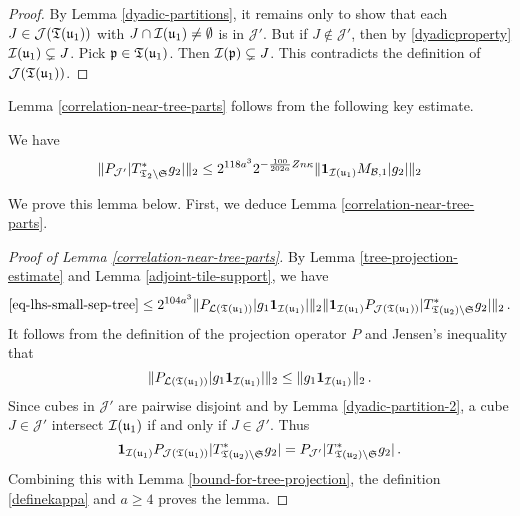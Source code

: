 {    \begin{proof}
        By Lemma \ref{dyadic-partitions}, it remains only to show that each $J \in \mathcal{J}({\mathfrak T}({\mathfrak u}_1))$ with $J \cap {\mathcal{I}}({\mathfrak u}_1) \ne \emptyset$ is in $\mathcal{J}'$. But if $J \notin \mathcal{J}'$, then by \eqref{dyadicproperty} ${\mathcal{I}}({\mathfrak u}_1) \subsetneq J$. Pick ${\mathfrak p} \in {\mathfrak T}({\mathfrak u}_1)$.  Then ${\mathcal{I}}({\mathfrak p}) \subsetneq J$. This contradicts the definition of $\mathcal{J}({\mathfrak T}({\mathfrak u}_1))$.
    \end{proof}

    Lemma \ref{correlation-near-tree-parts} follows from the following key estimate.

    \begin{lemma}
        \label{bound-for-tree-projection}
        We have
        $$
            \|P_{\mathcal{J}'}|T_{\mathfrak{T}_2 \setminus \mathfrak{S}}^* g_2|\|_2
            \le 2^{118a^3} 2^{-\frac{100}{202a}Zn\kappa} \|\mathbf{1}_{{\mathcal{I}}({\mathfrak u}_1)} M_{\mathcal{B},1} |g_2|\|_2
        $$
    \end{lemma}

    We prove this lemma below. First, we deduce Lemma \ref{correlation-near-tree-parts}.

    \begin{proof}[Proof of Lemma \ref{correlation-near-tree-parts}]
        By Lemma \ref{tree-projection-estimate} and Lemma \ref{adjoint-tile-support}, we have
        \begin{align*}
            \eqref{eq-lhs-small-sep-tree} \le 2^{104a^3} \|P_{\mathcal{L}({\mathfrak T}({\mathfrak u}_1))} |g_1\mathbf{1}_{{\mathcal{I}}({\mathfrak u}_1)}| \|_2 \|\mathbf{1}_{{\mathcal{I}}({\mathfrak u}_1)} P_{\mathcal{J}({\mathfrak T}({\mathfrak u}_1) )}|T_{{\mathfrak T}({\mathfrak u}_2) \setminus \mathfrak{S}}^* g_2|\|_2\,.
        \end{align*}
        It follows from the definition of the projection operator $P$ and Jensen's inequality that
        $$
            \|P_{\mathcal{L}({\mathfrak T}({\mathfrak u}_1))} |g_1\mathbf{1}_{{\mathcal{I}}({\mathfrak u}_1)}| \|_2 \le \|g_1 \mathbf{1}_{{\mathcal{I}}({\mathfrak u}_1)}\|_2\,.
        $$
        Since cubes in $\mathcal{J}'$ are pairwise disjoint and by Lemma \ref{dyadic-partition-2}, a cube $J \in \mathcal{J}'$ intersect ${\mathcal{I}}({\mathfrak u}_1)$ if and only if $J \in \mathcal{J}'$. Thus
        $$
            \mathbf{1}_{{\mathcal{I}}({\mathfrak u}_1)} P_{\mathcal{J}({\mathfrak T}({\mathfrak u}_1) )}|T_{{\mathfrak T}({\mathfrak u}_2) \setminus \mathfrak{S}}^* g_2| =  P_{\mathcal{J}'}|T_{{\mathfrak T}({\mathfrak u}_2) \setminus \mathfrak{S}}^* g_2|\,.
        $$
        Combining this with Lemma \ref{bound-for-tree-projection}, the definition \eqref{definekappa} and $a \ge 4$ proves the lemma.
    \end{proof}

}

